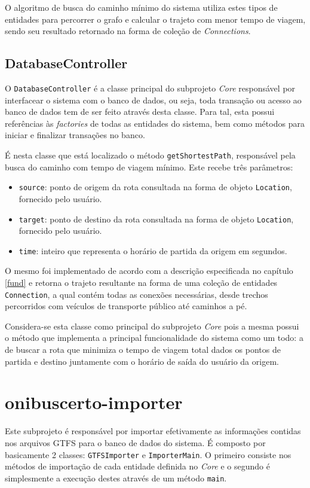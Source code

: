 O algoritmo de busca do caminho mínimo do sistema utiliza estes tipos de entidades para percorrer o grafo e calcular o trajeto com menor tempo de viagem, sendo seu resultado retornado na forma de coleção de \emph{Connections}.

\subsection{DatabaseController}
O \texttt{DatabaseController} é a classe principal do subprojeto \emph{Core} responsável por interfacear o sistema com o banco de dados, ou seja, toda transação ou acesso ao banco de dados tem de ser feito através desta classe.
Para tal, esta possui referências às \emph{factories} de todas as entidades do sistema, bem como métodos para iniciar e finalizar transações no banco.

É nesta classe que está localizado o método \texttt{getShortestPath}, responsável pela busca do caminho com tempo de viagem mínimo. 
Este recebe três parâmetros:

\begin{itemize}
	\item \texttt{source}: ponto de origem da rota consultada na forma de objeto \texttt{Location}, fornecido pelo usuário.
	\item \texttt{target}: ponto de destino da rota consultada na forma de objeto \texttt{Location}, fornecido pelo usuário.
	\item \texttt{time}: inteiro que representa o horário de partida da origem em segundos.
\end{itemize}

O mesmo foi implementado de acordo com a descrição especificada no capítulo \ref{fund} e retorna o trajeto resultante na forma de uma coleção de entidades \texttt{Connection}, a qual contém todas as conexões necessárias, desde trechos percorridos com veículos de transporte público até caminhos a pé.

Considera-se esta classe como principal do subprojeto \emph{Core} pois a mesma possui o método que implementa a principal funcionalidade do sistema como um todo: a de buscar a rota que minimiza o tempo de viagem total dados os pontos de partida e destino juntamente com o horário de saída do usuário da origem.

\section{onibuscerto-importer}
Este subprojeto é responsável por importar efetivamente as informações contidas nos arquivos GTFS para o banco de dados do sistema.
É composto por basicamente 2 classes: \texttt{GTFSImporter} e \texttt{ImporterMain}.
O primeiro consiste nos métodos de importação de cada entidade definida no \emph{Core} e o segundo é simplesmente a execução destes através de um método \texttt{main}.

